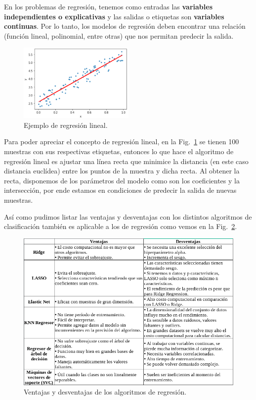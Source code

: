 \documentclass[a4paper,12pt]{article}
\begin{document}
En los problemas de regresión, tenemos como entradas las \textbf{variables independientes o explicativas} y las salidas o etiquetas son \textbf{variables continuas}. Por lo tanto, los modelos de regresión deben encontrar una relación (función lineal, polinomial, entre otras) que nos permitan predecir la salida.

\begin{figure}[H]
	\begin{center}				
	\includegraphics[width=0.5\textwidth]{tesis_9.png}
  	\caption{Ejemplo de regresión lineal.}
  	\label{fig:regressionlinear.}
  	\end{center}
\end{figure}

Para poder apreciar el concepto de regresión lineal, en la Fig.~\ref{fig:regressionlinear.} se tienen 100 muestras con sus respectivas etiquetas, entonces lo que hace el algoritmo de regresión lineal es ajustar una línea recta que minimice la distancia (en este caso distancia euclídea) entre los puntos de la muestra y dicha recta. Al obtener la recta, disponemos de los parámetros del modelo como son los coeficientes y la intersección, por ende estamos en condiciones de predecir la salida de nuevas muestras.

Así como pudimos listar las ventajas y desventajas con los distintos algoritmos de clasificación también es aplicable a los de regresión como vemos en la Fig.~\ref{fig:proconsregression.}.

\begin{figure}[H]
	\begin{center}				
	\includegraphics[width=1\textwidth]{tesis_10.png}
  	\caption{Ventajas y desventajas de los algoritmos de regresión.}
  	\label{fig:proconsregression.}
  	\end{center}
\end{figure}
\end{document}
